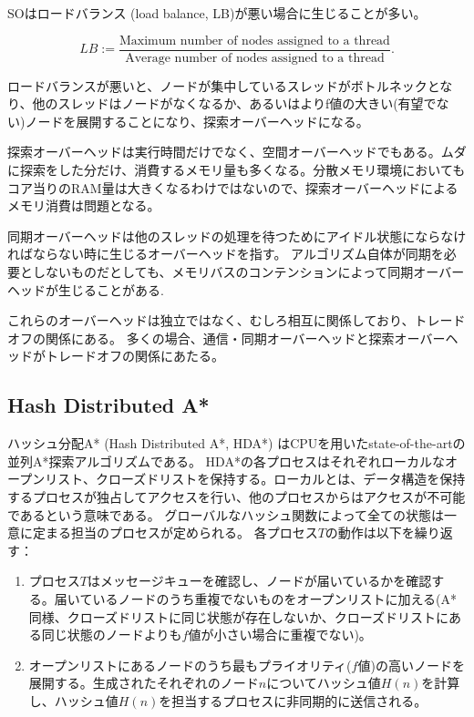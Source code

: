 \documentclass[b5paper]{report}
\begin{document}
SOはロードバランス (load balance, LB)が悪い場合に生じることが多い。

\begin{equation}
LB := \frac{\text{Maximum number of nodes assigned to a thread}}{\text{Average number of nodes assigned to a thread}}.
\end{equation}

ロードバランスが悪いと、ノードが集中しているスレッドがボトルネックとなり、他のスレッドはノードがなくなるか、あるいはよりf値の大きい(有望でない)ノードを展開することになり、探索オーバーヘッドになる。

探索オーバーヘッドは実行時間だけでなく、空間オーバーヘッドでもある。ムダに探索をした分だけ、消費するメモリ量も多くなる。分散メモリ環境においてもコア当りのRAM量は大きくなるわけではないので、探索オーバーヘッドによるメモリ消費は問題となる。


同期オーバーヘッドは他のスレッドの処理を待つためにアイドル状態にならなければならない時に生じるオーバーヘッドを指す。
アルゴリズム自体が同期を必要としないものだとしても、メモリバスのコンテンションによって同期オーバーヘッドが生じることがある\cite{burnslrz10,kishimotofb13}.


これらのオーバーヘッドは独立ではなく、むしろ相互に関係しており、トレードオフの関係にある。
多くの場合、通信・同期オーバーヘッドと探索オーバーヘッドがトレードオフの関係にあたる。


\subsection{Hash Distributed A*}
\label{sec:hash-distributed-astar}

ハッシュ分配A* (Hash Distributed A*, HDA*) \cite{kishimotofb13}はCPUを用いたstate-of-the-artの並列A*探索アルゴリズムである。
HDA*の各プロセスはそれぞれローカルなオープンリスト、クローズドリストを保持する。ローカルとは、データ構造を保持するプロセスが独占してアクセスを行い、他のプロセスからはアクセスが不可能であるという意味である。
グローバルなハッシュ関数によって全ての状態は一意に定まる担当のプロセスが定められる。
各プロセス$T$の動作は以下を繰り返す：

\begin{enumerate}
	\item 
		プロセス$T$はメッセージキューを確認し、ノードが届いているかを確認する。届いているノードのうち重複でないものをオープンリストに加える(A*同様、クローズドリストに同じ状態が存在しないか、クローズドリストにある同じ状態のノードよりも$f$値が小さい場合に重複でない)。
	\item 
		オープンリストにあるノードのうち最もプライオリティ($f$値)の高いノードを展開する。生成されたそれぞれのノード$n$についてハッシュ値$H(n)$を計算し、ハッシュ値$H(n)$を担当するプロセスに非同期的に送信される。
\end{enumerate}
\end{document}
